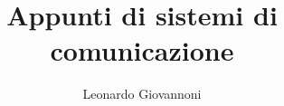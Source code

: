 \documentclass{article}
\title{Appunti di sistemi di comunicazione}
\author{Leonardo Giovannoni}
\begin{document}
\renewcommand{\proofname}{Dimostrazione}

\maketitle


 




\end{document}
